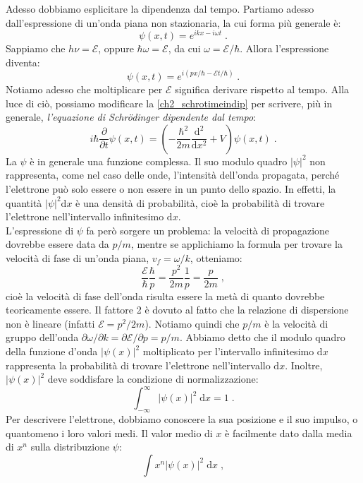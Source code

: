\documentclass[10pt,a4paper]{report}
\theoremstyle{definition}
\numberwithin{equation}{section}
\newcommand{\diff}[1][]{\mathrm{d}#1}
\begin{document}
Adesso dobbiamo esplicitare la dipendenza dal tempo. Partiamo adesso dall'espressione di un'onda piana non stazionaria, la cui forma più generale è:
$$
\psi(x,t)=e^{ikx-i\omega t}\;.
$$
Sappiamo che $h\nu=\mathcal{E}$, oppure $\hbar\omega=\mathcal{E}$, da cui $\omega=\mathcal{E}/\hbar$. Allora l'espressione diventa:
$$
\psi(x,t)=e^{i(px/\hbar-\mathcal{E}t/\hbar)}\;.
$$
Notiamo adesso che moltiplicare per $\mathcal{E}$ significa derivare rispetto al tempo. Alla luce di ciò, possiamo modificare la \eqref{ch2_schrotimeindip} per scrivere, più in generale, \textit{l'equazione di Schrödinger dipendente dal tempo}:
\begin{equation}
i\hbar\frac{\partial}{\partial t}\psi(x,t)=\left(-\frac{\hbar^2}{2m}\frac{\mathrm{d}^2}{\diff{x}^2}+V\right)\psi(x,t)\;. \label{ch2_schrotimedip}
\end{equation}
La $\psi$ è in generale una funzione complessa. Il suo modulo quadro $|\psi|^2$ non rappresenta, come nel caso delle onde, l'intensità dell'onda propagata, perché l'elettrone può solo essere o non essere in un punto dello spazio. In effetti, la quantità $|\psi|^2\diff{x}$ è una densità di probabilità, cioè la probabilità di trovare l'elettrone nell'intervallo infinitesimo $\diff{x}$. \\
L'espressione di $\psi$ fa però sorgere un problema: la velocità di propagazione dovrebbe essere data da $p/m$, mentre se applichiamo la formula per trovare la velocità di fase di un'onda piana, $v_f=\omega/k$, otteniamo:
$$
\frac{\mathcal{E}}{\hbar}\frac{\hbar}{p}=\frac{p^2}{2m}\frac{1}{p}=\frac{p}{2m}\;,
$$
cioè la velocità di fase dell'onda risulta essere la metà di quanto dovrebbe teoricamente essere. Il fattore 2 è dovuto al fatto che la relazione di dispersione non è lineare (infatti $\mathcal{E}=p^2/2m$). Notiamo quindi che $p/m$ è la velocità di gruppo dell'onda $\partial\omega/\partial k=\partial\mathcal{E}/\partial p=p/m$.
\linebreak
Abbiamo detto che il modulo quadro della funzione d'onda $|\psi(x)|^2$ moltiplicato per l'intervallo infinitesimo $\diff{x}$ rappresenta la probabilità di trovare l'elettrone nell'intervallo $\diff{x}$. Inoltre, $|\psi(x)|^2$ deve soddisfare la condizione di normalizzazione:
$$
\int_{-\infty}^{\infty} |\psi(x)|^2\;\diff{x}=1\;.
$$
Per descrivere l'elettrone, dobbiamo conoscere la sua posizione e il suo impulso, o quantomeno i loro valori medi. Il valor medio di $x$ è facilmente dato dalla media di $x^n$ sulla distribuzione $\psi$:
\begin{equation}
\int x^n|\psi(x)|^2\;\diff{x}\;,
\end{equation}
\end{document}

